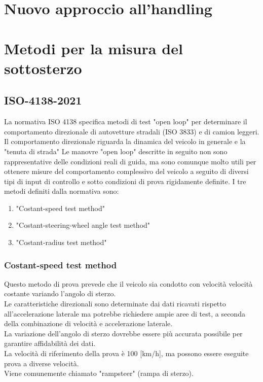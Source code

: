 \section{Nuovo approccio all'handling}


\section{Metodi per la misura del sottosterzo}
\subsection{ISO-4138-2021}
La normativa ISO 4138 specifica metodi di test "open loop" per determinare il comportamento direzionale di autovetture stradali (ISO 3833) e di camion leggeri.\\
Il comportamento direzionale riguarda la dinamica del veicolo in generale e la "tenuta di strada"
Le manovre "open loop" descritte in seguito non sono rappresentative delle condizioni reali di guida, ma sono comunque molto utili per ottenere misure del comportamento complessivo del veicolo a seguito di diversi tipi di input di controllo e sotto condizioni di prova rigidamente definite.
I tre metodi definiti dalla normativa \cite{iso4138} sono:
\begin{enumerate}
    \item "Costant-speed test method"
    \item "Costant-steering-wheel angle test method"
    \item "Costant-radius test method"
\end{enumerate}
\subsubsection{Costant-speed test method}
Questo metodo di prova prevede che il veicolo sia condotto con velocità velocità costante variando l'angolo di sterzo.\\
Le caratteristiche direzionali sono determinate dai dati ricavati rispetto all'accelerazione laterale ma potrebbe
richiedere ampie aree di test, a seconda della combinazione di velocità e accelerazione laterale. \\
La variazione dell'angolo di sterzo dovrebbe essere più accurata possibile per garantire affidabilità dei dati.\\
La velocità di riferimento della prova è 100 [km/h], ma possono essere eseguite prova a diverse velocità.\\
Viene comunemente chiamato "rampsteer" (rampa di sterzo).\\
